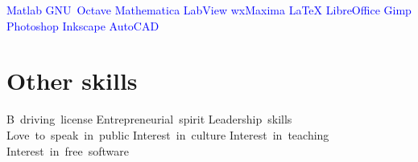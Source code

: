 \documentclass[11pt,a4paper,sans,spanish]{moderncv}
\begin{document}
\begin{center}
\textcolor{blue}{
Matlab \quad{} GNU~Octave \quad{} Mathematica \quad{} LabView \quad{} wxMaxima \quad{} LaTeX \quad{} LibreOffice \quad{} Gimp \quad{} Photoshop \quad{} Inkscape \quad{} AutoCAD
}
\end{center}


\section{Other skills}
\begin{center}
B~driving~license \quad{} Entrepreneurial~spirit \quad{} Leadership~skills \quad{} Love~to~speak~in~public \quad{} Interest~in~culture \quad{} Interest~in~teaching \quad{} Interest~in~free~software
\end{center}
\end{document}
